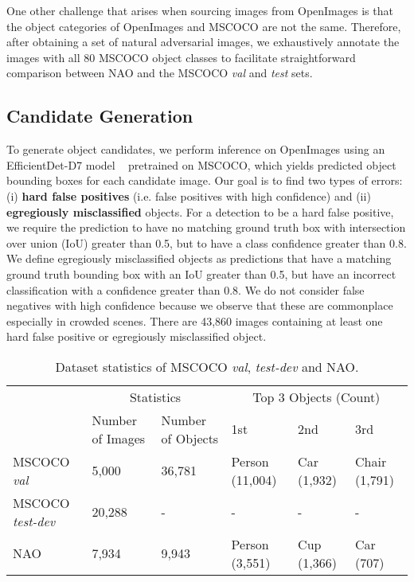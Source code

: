 \documentclass[final]{cvpr}
\begin{document}
One other challenge that arises when sourcing images from OpenImages is that the object categories of OpenImages and MSCOCO are not the same. Therefore, after obtaining a set of natural adversarial images, we exhaustively annotate the images with all 80 MSCOCO object classes to facilitate straightforward comparison between NAO and the MSCOCO \textit{val} and \textit{test} sets.

\subsection{Candidate Generation}
To generate object candidates, we perform inference on OpenImages using an EfficientDet-D7 model ~\cite{tan2020efficientdet} pretrained on MSCOCO, which yields predicted object bounding boxes for each candidate image.
Our goal is to find two types of errors: (i) \textbf{hard false positives} (i.e. false positives with high confidence) and (ii) \textbf{egregiously misclassified} objects.  
For a detection to be a hard false positive, we require the prediction to have no matching ground truth box with intersection over union (IoU) greater than 0.5, but to have a class confidence greater than 0.8.
We define egregiously misclassified objects as predictions that have a matching ground truth bounding box with an IoU greater than 0.5, but have an incorrect classification with a confidence greater than 0.8. We do not consider false negatives with high confidence because we observe that these are commonplace especially in crowded scenes.
There are 43,860 images containing at least one hard false positive or egregiously misclassified object.



\begin{table*}
\begin{center}
\begin{tabular}{l|l|l|l|l|l|}
\cline{2-6}
                                      & \multicolumn{2}{c|}{Statistics}      & \multicolumn{3}{c|}{Top 3 Objects (Count)}    \\ \cline{2-6} 
                                      & Number of Images & Number of Objects & 1st             & 2nd         & 3rd           \\ \hline
\multicolumn{1}{|l|}{MSCOCO \textit{val}}      & 5,000            & 36,781            & Person (11,004) & Car (1,932) & Chair (1,791) \\ \cline{1-1}
\multicolumn{1}{|l|}{MSCOCO \textit{test-dev}} & 20,288           & -                 & -               & -           & -             \\ \cline{1-1}
\multicolumn{1}{|l|}{NAO}             & 7,934            & 9,943             & Person (3,551)  & Cup (1,366) & Car (707)     \\ \cline{1-1}
\hline
\end{tabular}
\end{center}
\caption{Dataset statistics of MSCOCO \textit{val}, \textit{test-dev} and NAO.}
\end{table*}
\end{document}
